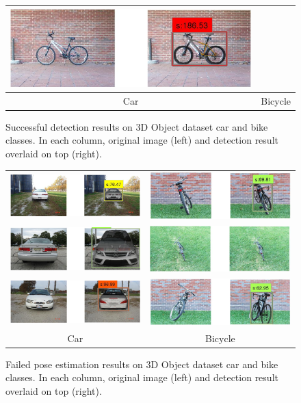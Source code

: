\documentclass[10pt,twocolumn,letterpaper]{article}
\begin{document}
\begin{figure}[h]
\begin{tabular}{|c|c|}
  \includegraphics[width=0.40\linewidth]{supp/bicycle16.png} \\
  \hline
  Car & Bicycle \\
  \hline
  \end{tabular}
\caption{Successful detection results on 3D Object dataset car and bike classes. In each column, original image (left) and detection result overlaid on top (right).}%
  \label{fig:3dobject_good}
\end{figure}


\begin{figure}[h]
\setlength\tabcolsep{1pt}
\centering
\begin{tabular}{|c|c|}
  \hline
  \includegraphics[width=0.40\linewidth]{supp/car13.png} &
  \includegraphics[width=0.40\linewidth]{supp/bicycle1.png} \\
  \includegraphics[width=0.40\linewidth]{supp/car30.png} &
  \includegraphics[width=0.40\linewidth]{supp/bicycle5.png} \\
  \includegraphics[width=0.40\linewidth]{supp/car18.png} &
  \includegraphics[width=0.40\linewidth]{supp/bicycle19.png} \\
  \hline
  Car & Bicycle \\
  \hline
  \end{tabular}
\caption{Failed pose estimation results on 3D Object dataset car and bike classes. In each column, original image (left) and detection result overlaid on top (right).}%
  \label{fig:3dobject_bad}
\end{figure}

\clearpage
\clearpage
{\small


}
\end{document}
